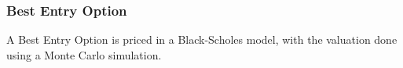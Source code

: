 \subsubsection{Best Entry Option}
\label{pricing::bestentryoption}

A Best Entry Option is priced in a Black-Scholes model, with the valuation done using a Monte Carlo simulation.